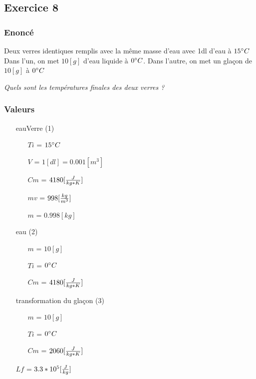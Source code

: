 
\subsection{Exercice 8}
\subsubsection{Enoncé}

Deux verres identiques remplis avec la même masse d'eau avec 1dl d'eau à $15\celsius$
Dans l'un, on met $10[g]$ d'eau liquide à $0\celsius$. Dans l'autre, on met un glaçon de $10[g]$ à $0\celsius$


\textit{Quels sont les températures finales des deux verres ?}
\subsubsection{Valeurs}
\begin{itemize}
    \item[eauVerre] (1)
    \item[] 
    \begin{itemize}
        \item[$Ti$] = $15\celsius$
        \item[$V$] = $1[dl] = 0.001[m^3]$
        \item[$Cm$] = $4180[\cm]$
        \item[$mv$] = $998[\mv]$ 
        \item[$m$] = $0.998[kg]$ 
    \end{itemize}
    \item[eau] (2)
    \item[] 
    \begin{itemize}
        \item[$m$] = $10[g]$
        \item[$Ti$] = $0\celsius$
        \item[$Cm$] = $4180[\cm]$
    \end{itemize}
    \item[transformation du glaçon] (3)
    \item[] 
    \begin{itemize}
        \item[$m$] = $10[g]$
        \item[$Ti$] = $0\celsius$
        \item[$Cm$] = $2060[\cm]$
    \end{itemize}
    \item[$Lf$] = $3.3*10^5[\lf]$
\end{itemize}
